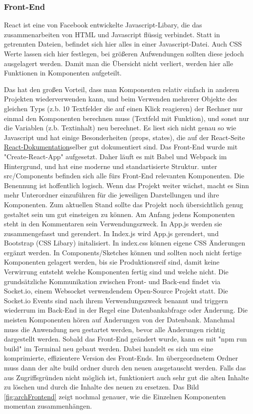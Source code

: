 \documentclass[12pt]{article} %
\begin{document}
\subsubsection{Front-End}
React ist eine von Facebook entwickelte Javascript-Libary, die das zusammenarbeiten von HTML und Javascript flüssig verbindet.
Statt in getrennten Dateien, befindet sich hier alles in einer Javascript-Datei. 
Auch CSS Werte lassen sich hier festlegen, bei größeren Aufwendungen sollten diese jedoch ausgelagert werden.
Damit man die Übersicht nicht verliert, werden hier alle Funktionen in Komponenten aufgeteilt. 

Das hat den großen Vorteil, 
dass man Komponenten relativ einfach in anderen Projekten wiederverwenden kann, und beim Verwenden mehrerer Objekte des gleichen Typs (z.b. 10 Textfelder die auf einen Klick reagieren) der Rechner nur einmal den Komponenten berechnen muss (Textfeld mit Funktion), 
und sonst nur die Variablen (z.b. Textinhalt) neu berechnet. 
Es liest sich nicht genau so wie Javascript und hat einige Besonderheiten (props, states), die auf der React-Seite \href{https://reactjs.org/docs/hello-world.html}{React-Dokumentation}selber gut dokumentiert sind.
Das Front-End wurde mit "Create-React-App" aufgesetzt. 
Daher läuft es mit Babel und Webpack im Hintergrund, und hat eine moderne und standartisierte Struktur.
unter src/Components befinden sich alle fürs Front-End relevanten Komponenten.
Die Benennung ist hoffentlich logisch. 
Wenn das Projekt weiter wächst, macht es Sinn mehr Unterordner einzuführen für die jeweiligen Darstellungen und ihre Komponenten. 
Zum aktuellen Stand sollte das Projekt noch übersichtlich genug gestaltet sein um gut einsteigen zu können.
Am Anfang jedens Komponenten steht in den Kommentaren sein Verwendungszweck. 
In App.js werden sie zusammengefasst und gerendert.
In Index.js wird App.js gerendert, und Bootstrap (CSS Libary) initalisiert. 
In index.css können eigene CSS Änderungen ergänzt werden.
In Components/Sketches können und sollten noch nicht fertige Komponenten gelagert werden, bis sie Produktionsreif sind, damit keine Verwirrung entsteht welche Komponenten fertig sind und welche nicht.
Die grundsätzliche Kommunikation zwischen Front- und Back-end findet via Socket.io, einem Websocket verwendendem Open-Source Projekt statt.
Die Socket.io Events sind nach ihrem Verwendungszweck benannt und triggern wiederrum im Back-End in der Regel eine Datenbankabfrage oder Änderung.
Die meisten Komponenten hören auf Änderungen von der Datenbank. Manchmal muss die Anwendung neu gestartet werden, bevor alle Änderungen richtig dargestellt werden.
Sobald das Front-End geändert wurde, kann es mit "npm run build" im Terminal neu gebaut werden. Dabei handelt es sich um eine komprimierte, effizientere Version des Front-Ends.
Im übergeordnetem Ordner muss dann der alte build ordner durch den neuen ausgetauscht werden. 
Falls das aus Zugriffsgründen nicht möglich ist, funktioniert auch sehr gut die alten Inhalte zu löschen und durch die Inhalte des neuen zu ersetzen.
Das Bild \ref{fig:archFrontend} zeigt nochmal genauer, wie die Einzelnen Komponenten momentan zusammenhängen.
\end{document}
